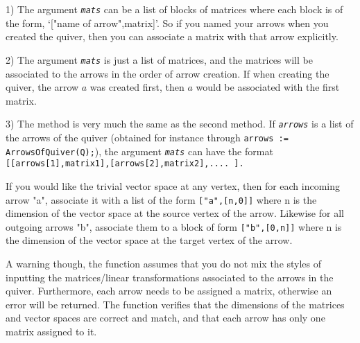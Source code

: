 \documentclass[a4paper,11pt]{report}
\begin{document}
{{{ 1) The argument \mbox{\texttt{\slshape mats}} can be a list of blocks of matrices where each block is of the form, `["name
of arrow",matrix]'. So if you named your arrows when you created the quiver,
then you can associate a matrix with that arrow explicitly.

 2) The argument \mbox{\texttt{\slshape mats}} is just a list of matrices, and the matrices will be associated to the arrows
in the order of arrow creation. If when creating the quiver, the arrow $a$ was created first, then $a$ would be associated with the first matrix.

 3) The method is very much the same as the second method. If \mbox{\texttt{\slshape arrows}} is a list of the arrows of the quiver (obtained for instance through \texttt{arrows := ArrowsOfQuiver(Q);}), the argument \mbox{\texttt{\slshape mats}} can have the format \texttt{[[arrows[1],matrix{\textunderscore}1],[arrows[2],matrix{\textunderscore}2],....
].}

 If you would like the trivial vector space at any vertex, then for each
incoming arrow "a", associate it with a list of the form \texttt{["a",[n,0]]} where n is the dimension of the vector space at the source vertex of the
arrow. Likewise for all outgoing arrows "b", associate them to a block of form \texttt{["b",[0,n]]} where n is the dimension of the vector space at the target vertex of the
arrow.

 A warning though, the function assumes that you do not mix the styles of
inputting the matrices/linear transformations associated to the arrows in the
quiver. Furthermore, each arrow needs to be assigned a matrix, otherwise an
error will be returned. The function verifies that the dimensions of the
matrices and vector spaces are correct and match, and that each arrow has only
one matrix assigned to it.

 }

}}
\end{document}
